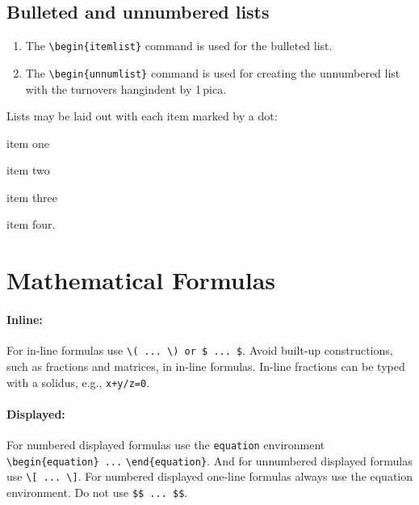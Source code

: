 \subsection{Bulleted and unnumbered lists}

\begin{enumerate}
\item The \verb|\begin{itemlist}| command is used for the bulleted list.

\smallskip

\item The \verb|\begin{unnumlist}| command is used for creating the
  unnumbered list with the turnovers hangindent by 1\,pica.
\end{enumerate}

Lists may be laid out with each item marked by a dot:

\begin{itemlist}
\item item one
\item item two
\item item three
\item item four.
\end{itemlist}

\section{Mathematical Formulas}
\paragraph{Inline:}
For in-line formulas use \verb|\( ... \) or $ ... $|. Avoid built-up
constructions, such as fractions and matrices, in in-line
formulas. In-line fractions can be typed with a solidus, e.g.,
\verb|x+y/z=0|.

\paragraph{Displayed:}
For numbered displayed formulas use the \verb|equation| environment
\verb|\begin{equation} ...| \verb|\end{equation}|.
And for unnumbered displayed formulas use \verb|\[ ... \]|. For
numbered displayed one-line formulas always use the equation
environment. Do not use \verb|$$ ... $$|.

